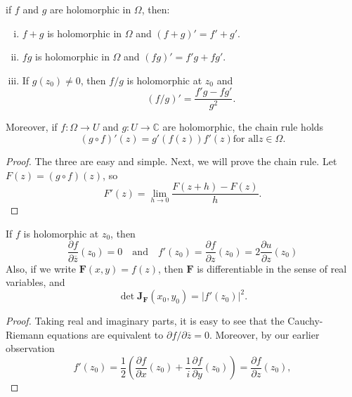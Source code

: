 \begin{proposition}
    if $f$ and $g$ are holomorphic in $\Omega$, then:
    \begin{enumerate}[(i)]
    \item $f+g$ is holomorphic in $\Omega$ and $(f+g)'=f'+g'$.
    \item $fg$ is holomorphic in $\Omega$ and $(fg)'=f'g+fg'$.
    \item If $g(z_0)\ne 0$, then $f/g$ is holomorphic at $z_0$ and
    \[
        (f/g)'=\frac{f'g-fg'}{g^2}.
    \]
    \end{enumerate}
    Moreover, if $f:\Omega\to U$ and $g:U\to\mathbb{C}$ are holomorphic, the chain
    rule holds
    \[
        (g\circ f)'(z)=g'(f(z))f'(z) \text{for all} z\in\Omega.
    \]
\end{proposition}
\begin{proof}
    The three are easy and simple. Next, we will prove the chain rule.
    Let $F(z) = (g\circ f)(z)$, so
    \[
        F'(z)=\lim_{h\to 0}\frac{F(z+h)-F(z)}{h}.
    \]
\end{proof}

\begin{proposition}
    If $f$ is holomorphic at $z_0$, then
    \[
        \frac{\partial f}{\partial \overline{z}}(z_0)=0\quad \text{and} \quad
        f'(z_0)=\frac{\partial f}{\partial z}(z_0)=2\frac{\partial u}{\partial z}(z_0)
    \]
    Also, if we write $\bm{F}(x,y)=f(z)$, then $\bm{F}$ is differentiable in the sense
    of real variables, and
    \[
        \det{{\bm J}_{\bm F}(x_0,y_0)}=|f'(z_0)|^2.
    \]
\end{proposition}
\begin{proof}
    Taking real and imaginary parts, it is easy to see that the Cauchy-Riemann equations
    are equivalent to $\partial f/\partial \overline{z}=0$. Moreover, by our earlier observation
    \[
        f'(z_0)=\frac{1}{2}(\frac{\partial f}{\partial x}(z_0)+
        \frac{1}{i}\frac{\partial f}{\partial y}(z_0))=\frac{\partial f}{\partial z}(z_0),
    \]
\end{proof}

